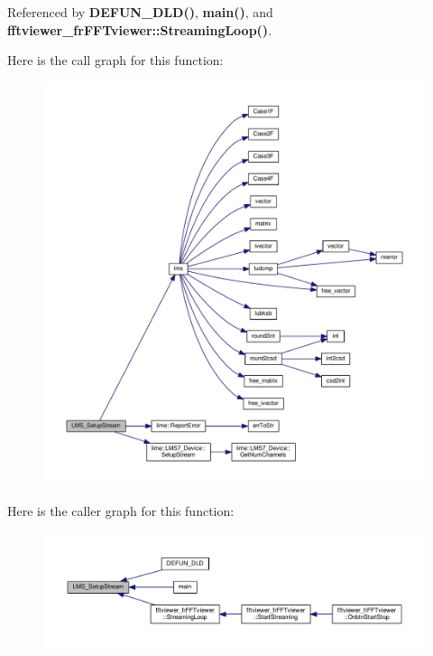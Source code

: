 Referenced by {\bf D\+E\+F\+U\+N\+\_\+\+D\+L\+D()}, {\bf main()}, and {\bf fftviewer\+\_\+fr\+F\+F\+Tviewer\+::\+Streaming\+Loop()}.



Here is the call graph for this function\+:
\nopagebreak
\begin{figure}[H]
\begin{center}
\leavevmode
\includegraphics[width=350pt]{df/de1/lms7__api_8cpp_a77a9a5cd43aea28499a07f93951640b2_cgraph}
\end{center}
\end{figure}




Here is the caller graph for this function\+:
\nopagebreak
\begin{figure}[H]
\begin{center}
\leavevmode
\includegraphics[width=350pt]{df/de1/lms7__api_8cpp_a77a9a5cd43aea28499a07f93951640b2_icgraph}
\end{center}
\end{figure}


